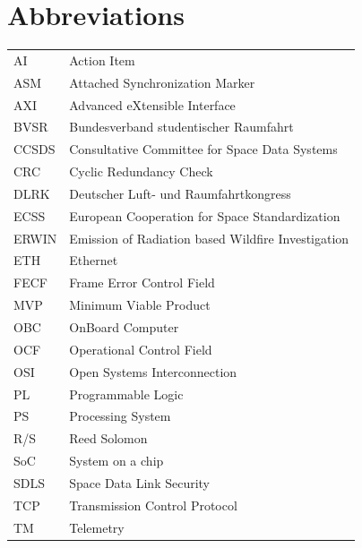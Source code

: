 \chapter{Abbreviations}

\begin{tabular}{p{2cm} p{15cm}}
    AI & Action Item \\
    ASM & Attached Synchronization Marker \\
    AXI & Advanced eXtensible Interface \\
    BVSR & Bundesverband studentischer Raumfahrt \\
    CCSDS & Consultative Committee for Space Data Systems \\
    CRC & Cyclic Redundancy Check \\
    DLRK & Deutscher Luft- und Raumfahrtkongress \\
    ECSS & European Cooperation for Space Standardization \\
    ERWIN & Emission of Radiation based Wildfire Investigation \\
    ETH & Ethernet \\
    FECF & Frame Error Control Field \\
    MVP & Minimum Viable Product \\
    OBC & OnBoard Computer \\
    OCF & Operational Control Field \\
    OSI & Open Systems Interconnection \\
    PL & Programmable Logic \\
    PS & Processing System \\
    R/S & Reed Solomon \\
    SoC & System on a chip \\
    SDLS & Space Data Link Security \\
    TCP & Transmission Control Protocol \\
    TM & Telemetry \\
\end{tabular}